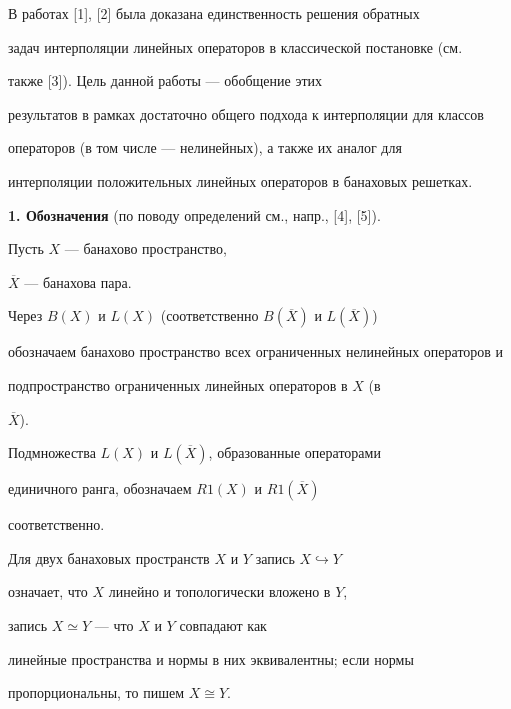 \maketitle


\label{begin}





В работах [1], [2] была доказана единственность решения обратных 


задач интерполяции линейных операторов в классической постановке (см.


также [3]). Цель данной работы --- обобщение этих 


результатов в рамках достаточно общего подхода к интерполяции для классов 


операторов (в том числе --- нелинейных), а также их аналог для 


интерполяции положительных линейных операторов в банаховых решетках. 


\medskip





{\bf 1. Обозначения} (по поводу определений см., напр., [4], [5]).


Пусть $X$ --- банахово пространство,


$\overline X$ --- банахова пара.


Через $B(X)$ и $L(X)$ (соответственно $B(\overline X)$ и $L(\overline X)$)


обозначаем банахово пространство всех ограниченных нелинейных операторов и


подпространство ограниченных линейных операторов в $X$ (в


$\overline X$).  


Подмножества $L(X)$ и $L(\overline X)$, образованные операторами


единичного ранга, обозначаем $R1(X)$ и $R1(\overline X)$


соответственно.





Для двух банаховых пространств $X$ и $Y$ запись $X \hookrightarrow Y$ 


означает, что $X$ линейно и топологически вложено в $Y$, 


запись $X \simeq Y$ --- что $X$ и $Y$ совпадают как 


линейные пространства и нормы в них эквивалентны; если нормы 


пропорциональны, то пишем $X \cong Y$.





